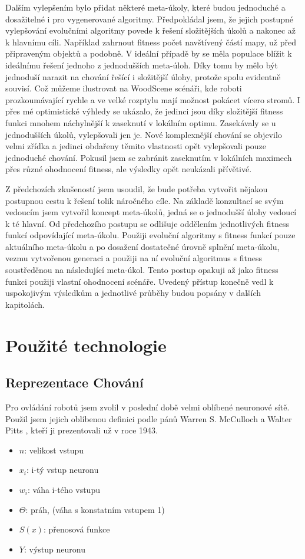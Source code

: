 \par 
Dalším vylepšením bylo přidat některé meta-úkoly, které budou jednoduché a dosažitelné i pro vygenerované algoritmy. Předpokládal jsem, že jejich postupné vylepšování evolučními algoritmy povede k řešení složitějších úkolů a nakonec až k hlavnímu cíli. Například zahrnout fitness počet navštívený částí mapy, už před připraveným objektů a podobně. V ideální případě by se měla populace blížit k ideálnímu řešení jednoho z jednodušších meta-úloh. Díky tomu by mělo být jednoduší narazit na chování řešící i složitější úlohy, protože spolu evidentně souvisí. Což můžeme ilustrovat na WoodScene scénáři, kde roboti prozkoumávající rychle a ve velké rozptylu mají možnost pokácet vícero stromů. I přes mé optimistické výhledy se ukázalo, že jedinci jsou díky složitější fitness funkci mnohem náchylnější k zaseknutí v lokálním optimu. Zasekávaly se u jednodušších úkolů, vylepšovali jen je. Nové komplexnější chování se objevilo velmi zřídka a jedinci obdařeny těmito vlastnosti opět vylepšovali pouze jednoduché chování. Pokusil jsem se zabránit zaseknutím v lokálních maximech přes různé ohodnocení fitness, ale výsledky opět neukázali přívětivé.\par
Z předchozích zkušeností jsem usoudil, že bude potřeba vytvořit nějakou postupnou cestu k řešení tolik náročného cíle.  Na základě konzultací se svým vedoucím jsem vytvořil koncept meta-úkolů, jedná se o jednodušší úlohy vedoucí k té hlavní. Od předchozího postupu se odlišuje oddělením jednotlivých fitness funkcí odpovídající meta-úkolu. Použiji evoluční algoritmy s fitness funkcí pouze aktuálního meta-úkolu a po dosažení dostatečné úrovně splnění meta-úkolu, vezmu vytvořenou generaci a použiji na ní evoluční algoritmus s fitness soustředěnou na následující meta-úkol. Tento postup opakuji až jako fitness funkci použiji vlastní ohodnocení scénáře. Uvedený přístup konečně vedl k uspokojivým výsledkům a jednotlivé průběhy budou popsány v dalších kapitolách. 
\section{Použité technologie}
\subsection{Reprezentace Chování}
Pro ovládání robotů jsem zvolil v poslední době velmi oblíbené neuronové sítě. Použil jsem jejich oblíbenou definici podle pánů Warren S. McCulloch a  Walter Pitts \citep{neuron}, kteří ji prezentovali už v roce 1943. 
\begin{itemize}[]
	\item $n$: velikost vstupu
	\item $x_i$:  i-tý vstup neuronu
	\item $w_i$:  váha i-tého vstupu
	\item $\Theta$: práh, (váha s konstatním vstupem 1)
	\item $S(x)$: přenosová funkce
	\item $Y$: výstup neuronu 
\end{itemize}


